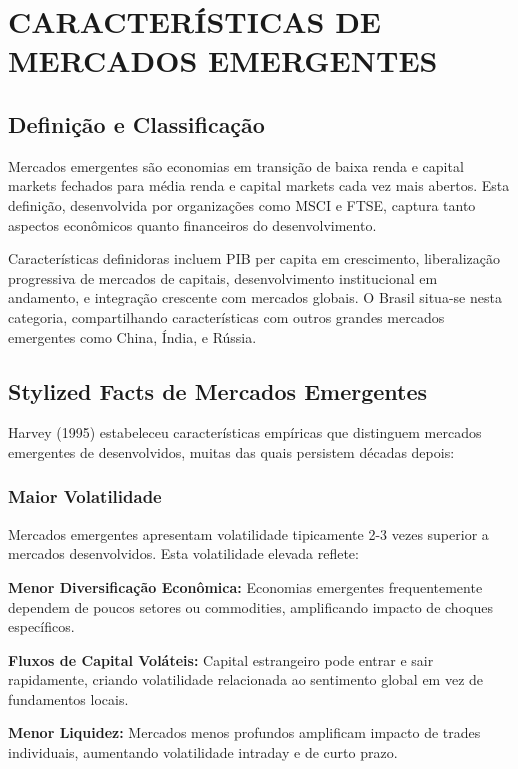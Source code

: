 \section{CARACTERÍSTICAS DE MERCADOS EMERGENTES}

\subsection{Definição e Classificação}

Mercados emergentes são economias em transição de baixa renda e capital markets fechados para média renda e capital markets cada vez mais abertos. Esta definição, desenvolvida por organizações como MSCI e FTSE, captura tanto aspectos econômicos quanto financeiros do desenvolvimento.

Características definidoras incluem PIB per capita em crescimento, liberalização progressiva de mercados de capitais, desenvolvimento institucional em andamento, e integração crescente com mercados globais. O Brasil situa-se nesta categoria, compartilhando características com outros grandes mercados emergentes como China, Índia, e Rússia.

\subsection{Stylized Facts de Mercados Emergentes}

Harvey (1995) estabeleceu características empíricas que distinguem mercados emergentes de desenvolvidos, muitas das quais persistem décadas depois:

\subsubsection{Maior Volatilidade}

Mercados emergentes apresentam volatilidade tipicamente 2-3 vezes superior a mercados desenvolvidos. Esta volatilidade elevada reflete:

\textbf{Menor Diversificação Econômica:} Economias emergentes frequentemente dependem de poucos setores ou commodities, amplificando impacto de choques específicos.

\textbf{Fluxos de Capital Voláteis:} Capital estrangeiro pode entrar e sair rapidamente, criando volatilidade relacionada ao sentimento global em vez de fundamentos locais.

\textbf{Menor Liquidez:} Mercados menos profundos amplificam impacto de trades individuais, aumentando volatilidade intraday e de curto prazo.

